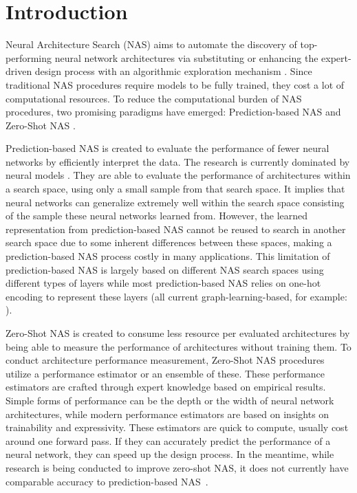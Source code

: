 \documentclass[lettersize,journal]{IEEEtran}
\begin{document}
\section{Introduction}









Neural Architecture Search (NAS) aims to automate the discovery of top-performing neural network architectures via substituting or enhancing the expert-driven design process with an algorithmic exploration mechanism \cite{nassucess1, nassucess2, nassucess3, nassucess4}. Since traditional NAS procedures require models to be fully trained, they cost a lot of computational resources. To reduce the computational burden of NAS procedures, two promising paradigms have emerged: Prediction-based NAS \cite{learningcurve, sppedup, nasbot, BRP-NAS, TNASP} and Zero-Shot NAS \cite{naswot, TE-NAS, LightweightNAS, Zen-NAS}.

Prediction-based NAS is created to evaluate the performance of fewer neural networks by efficiently interpret the data. The research is currently dominated by neural models \cite{BRP-NAS, Gate}. They are able to evaluate the performance of architectures within a search space, using only a small sample from that search space. It implies that neural networks can generalize extremely well within the search space consisting of the sample these neural networks learned from. However, the learned representation from prediction-based NAS cannot be reused to search in another search space due to some inherent differences between these spaces, making a prediction-based NAS process costly in many applications. This limitation of prediction-based NAS is largely based on different NAS search spaces using different types of layers while most prediction-based NAS relies on one-hot encoding to represent these layers (all current graph-learning-based, for example: \cite{BRP-NAS, TNASP}).

Zero-Shot NAS is created to consume less resource per evaluated architectures by being able to measure the performance of architectures without training them. To conduct architecture performance measurement, Zero-Shot NAS procedures utilize a performance estimator or an ensemble of these. These performance estimators are crafted through expert knowledge based on empirical results. Simple forms of performance can be the depth or the width of neural network architectures, while modern performance estimators are based on insights on trainability and expressivity. These estimators are quick to compute, usually cost around one forward pass. If they can accurately predict the performance of a neural network, they can speed up the design process. In the meantime, while research is being conducted to improve zero-shot NAS, it does not currently have comparable accuracy to prediction-based NAS~\cite{BRP-NAS, naswot}.
\end{document}
